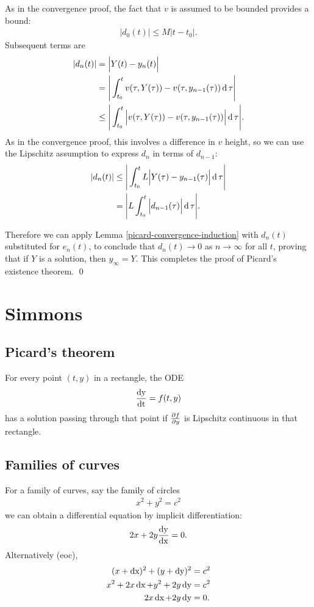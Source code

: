 As in the convergence proof, the fact that $v$ is assumed to be bounded
provides a bound:
\begin{align*}
  |d_0(t)| \leq M|t - t_0|.
\end{align*}
Subsequent terms are
\begin{align*}
  |d_n(t)| &=    \Big|Y(t) - y_n(t)\Big|\\
           &=    \Bigg|\int_{t_0}^t v(\tau, Y(\tau)) - v(\tau, y_{n-1}(\tau)) \operatorname{\text{d}}\tau\Bigg|\\
           &\leq \Bigg|\int_{t_0}^t \Big|v(\tau, Y(\tau)) - v(\tau, y_{n-1}(\tau))\Big| \operatorname{\text{d}}\tau\Bigg|.
\end{align*}
As in the convergence proof, this involves a difference in $v$ height, so we
can use the Lipschitz assumption to express $d_n$ in terms of $d_{n-1}$:
\begin{align*}
  |d_n(t)| &\leq \Bigg|\int_{t_0}^t L\Big|Y(\tau) - y_{n-1}(\tau)\Big| \operatorname{\text{d}}\tau\Bigg|\\
           &   = \Bigg|L\int_{t_0}^t \Big|d_{n-1}(\tau)\Big| \operatorname{\text{d}}\tau\Bigg|.
\end{align*}

Therefore we can apply Lemma \ref{picard-convergence-induction} with $d_n(t)$
substituted for $e_n(t)$, to conclude that $d_n(t) \to 0$ as $n \to \infty$ for
all $t$, proving that if $Y$ is a solution, then $y_\infty = Y$. This completes
the proof of Picard's existence theorem. \qed


\newpage
\section{Simmons}

\subsection{Picard's theorem}
For every point $(t, y)$ in a rectangle, the ODE
\begin{align*}
  \frac{\operatorname{\text{dy}}}{\operatorname{\text{dt}}} = f(t, y)
\end{align*}
has a solution passing through that point if $\frac{\partial f}{\partial y}$ is Lipschitz
continuous in that rectangle.

\subsection{Families of curves}
For a family of curves, say the family of circles
\begin{align}
  x^2 + y^2 = c^2 \label{simmons-circles}
\end{align}
we can obtain a differential equation by implicit differentiation:
\begin{align}
  2x + 2y\frac{\operatorname{\text{dy}}}{\operatorname{\text{dx}}} = 0. \label{simmons-circles-de}
\end{align}
Alternatively (eoc),
\begin{align*}
  (x + \operatorname{\text{dx}})^2 + (y + \operatorname{\text{dy}})^2 &= c^2\\
  x^2 + 2x\operatorname{\text{dx}} + y^2 + 2y\operatorname{\text{dy}} &= c^2\\
        2x\operatorname{\text{dx}}  + 2y\operatorname{\text{dy}}     &= 0.
\end{align*}

